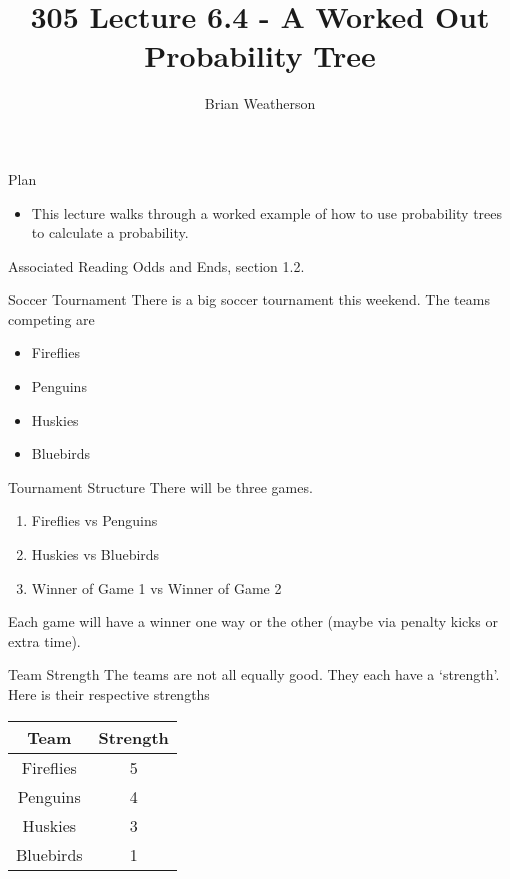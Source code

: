 \documentclass[
  ignorenonframetext,
]{beamer}
\title{305 Lecture 6.4 - A Worked Out Probability Tree}
\author{Brian Weatherson}
\date{}
\providecommand{\tightlist}{%
  \setlength{\itemsep}{0pt}\setlength{\parskip}{0pt}}
\renewcommand{\,}{\text{, }}
\begin{document}
\frame{\titlepage}

\begin{frame}{Plan}
\protect\hypertarget{plan}{}
\begin{itemize}
\tightlist
\item
  This lecture walks through a worked example of how to use probability
  trees to calculate a probability.
\end{itemize}
\end{frame}

\begin{frame}{Associated Reading}
\protect\hypertarget{associated-reading}{}
Odds and Ends, section 1.2.
\end{frame}

\begin{frame}{Soccer Tournament}
\protect\hypertarget{soccer-tournament}{}
There is a big soccer tournament this weekend. The teams competing are

\begin{itemize}
\tightlist
\item
  Fireflies
\item
  Penguins
\item
  Huskies
\item
  Bluebirds
\end{itemize}
\end{frame}

\begin{frame}{Tournament Structure}
\protect\hypertarget{tournament-structure}{}
There will be three games.

\begin{enumerate}
\tightlist
\item
  Fireflies vs Penguins
\item
  Huskies vs Bluebirds
\item
  Winner of Game 1 vs Winner of Game 2
\end{enumerate}

Each game will have a winner one way or the other (maybe via penalty
kicks or extra time).
\end{frame}

\begin{frame}{Team Strength}
\protect\hypertarget{team-strength}{}
The teams are not all equally good. They each have a `strength'. Here is
their respective strengths

\begin{longtable}[]{@{}cc@{}}
\toprule
Team & Strength \\
\midrule
\endhead
Fireflies & 5 \\
Penguins & 4 \\
Huskies & 3 \\
Bluebirds & 1 \\
\bottomrule
\end{longtable}
\end{frame}
\end{document}
